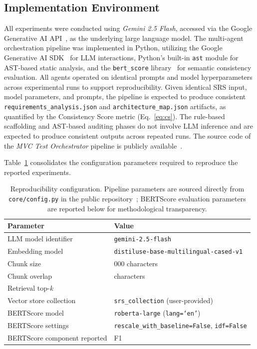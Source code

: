 \subsection{Implementation Environment}

All experiments were conducted using \textit{Gemini 2.5 Flash},
accessed via the Google Generative AI API~\citep{gemini2025}, as the underlying
large language model. The multi-agent orchestration pipeline was 
implemented in Python, utilizing the Google Generative AI 
SDK~\citep{googlegenai2025} for LLM interactions, Python's 
built-in \texttt{ast} module for AST-based static analysis, and 
the \texttt{bert\_score} library~\citep{zhang2019bertscore} for 
semantic consistency evaluation. All agents operated on identical 
prompts and model hyperparameters across experimental runs to 
support reproducibility. Given identical SRS input, model 
parameters, and prompts, the pipeline is expected to produce 
consistent \texttt{requirements\_analysis.json} and 
\texttt{architecture\_map.json} artifacts, as quantified by the 
Consistency Score metric (Eq.~\ref{eq:cs}). The 
rule-based scaffolding and AST-based auditing phases do not involve
LLM inference and are expected to produce consistent outputs across
repeated runs.
The source code of the \textit{MVC Test Orchestrator} pipeline
is publicly available~\citep{mvctestorchestrator2026}.

Table~\ref{tab:reproducibility} consolidates the configuration parameters required to reproduce the reported experiments.

\begin{table}[htbp]
\centering
\caption{Reproducibility configuration. Pipeline parameters are sourced directly from \texttt{core/config.py} in the public repository~\citep{mvctestorchestrator2026}; BERTScore evaluation parameters are reported below for methodological transparency.}
\label{tab:reproducibility}
\renewcommand{\arraystretch}{1.2}
\begin{tabularx}{\textwidth}{@{} l >{\raggedright\arraybackslash}X @{}}
\toprule
\textbf{Parameter} & \textbf{Value} \\
\midrule
LLM model identifier     & \texttt{gemini-2.5-flash} \\
Embedding model          & \texttt{distiluse-base-multilingual-cased-v1} \\
Chunk size               & 1{,}000 characters \\
Chunk overlap            & 100 characters \\
Retrieval top-\textit{k} & 5 \\
Vector store collection  & \texttt{srs\_collection} (user-provided) \\
BERTScore model          & \texttt{roberta-large} (\texttt{lang=`en'}) \\
BERTScore settings       & \texttt{rescale\_with\_baseline=False}, \texttt{idf=False} \\
BERTScore component reported & F1 \\
\bottomrule
\end{tabularx}
\end{table}

